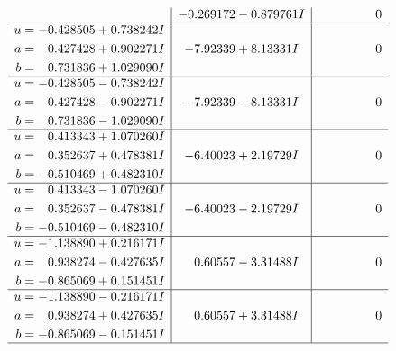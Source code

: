 \documentclass[1p]{elsarticle_modified}
\theoremstyle{definition}
\begin{document}
$$\begin{array}{c|c|c}
 & -0.269172 - 0.879761 I & \phantom{-0.000000 } 0 \\ \hline\begin{aligned}
u &= -0.428505 + 0.738242 I \\
a &= \phantom{-}0.427428 + 0.902271 I \\
b &= \phantom{-}0.731836 + 1.029090 I\end{aligned}
 & -7.92339 + 8.13331 I & \phantom{-0.000000 } 0 \\ \hline\begin{aligned}
u &= -0.428505 - 0.738242 I \\
a &= \phantom{-}0.427428 - 0.902271 I \\
b &= \phantom{-}0.731836 - 1.029090 I\end{aligned}
 & -7.92339 - 8.13331 I & \phantom{-0.000000 } 0 \\ \hline\begin{aligned}
u &= \phantom{-}0.413343 + 1.070260 I \\
a &= \phantom{-}0.352637 + 0.478381 I \\
b &= -0.510469 + 0.482310 I\end{aligned}
 & -6.40023 + 2.19729 I & \phantom{-0.000000 } 0 \\ \hline\begin{aligned}
u &= \phantom{-}0.413343 - 1.070260 I \\
a &= \phantom{-}0.352637 - 0.478381 I \\
b &= -0.510469 - 0.482310 I\end{aligned}
 & -6.40023 - 2.19729 I & \phantom{-0.000000 } 0 \\ \hline\begin{aligned}
u &= -1.138890 + 0.216171 I \\
a &= \phantom{-}0.938274 - 0.427635 I \\
b &= -0.865069 + 0.151451 I\end{aligned}
 & \phantom{-}0.60557 - 3.31488 I & \phantom{-0.000000 } 0 \\ \hline\begin{aligned}
u &= -1.138890 - 0.216171 I \\
a &= \phantom{-}0.938274 + 0.427635 I \\
b &= -0.865069 - 0.151451 I\end{aligned}
 & \phantom{-}0.60557 + 3.31488 I & \phantom{-0.000000 } 0\\
 \hline 
 \end{array}$$\newpage$$\begin{array}{c|c|c}  

\end{array}$$
\end{document}
